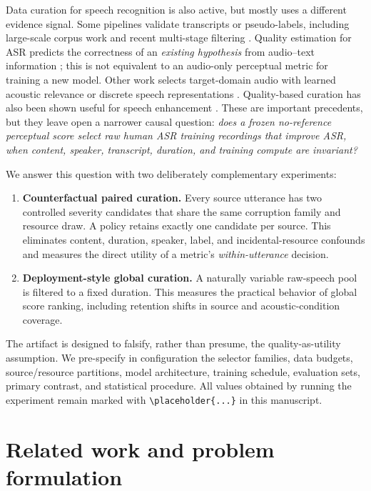 \documentclass[10pt,twocolumn]{article}
\newcommand{\placeholder}[1]{\textcolor{red}{\fbox{\scriptsize\textsf{#1}}}}
\newcommand{\asr}{\textsc{ASR}}
\begin{document}
Data curation for speech recognition is also active, but mostly uses a different evidence signal. Some pipelines validate transcripts or pseudo-labels, including large-scale corpus work and recent multi-stage filtering \citep{rangappa2025multistage}. Quality estimation for \asr{} predicts the correctness of an \emph{existing hypothesis} from audio--text information \citep{negri2014quality}; this is not equivalent to an audio-only perceptual metric for training a new model. Other work selects target-domain audio with learned acoustic relevance \citep{park2022contrastive} or discrete speech representations \citep{lu2022discrete}. Quality-based curation has also been shown useful for speech enhancement \citep{li2025lessismore}. These are important precedents, but they leave open a narrower causal question: \emph{does a frozen no-reference perceptual score select raw human \asr{} training recordings that improve \asr{}, when content, speaker, transcript, duration, and training compute are invariant?}

We answer this question with two deliberately complementary experiments:

\begin{enumerate}[leftmargin=1.2em,itemsep=0.15em]
    \item \textbf{Counterfactual paired curation.} Every source utterance has two controlled severity candidates that share the same corruption family and resource draw. A policy retains exactly one candidate per source. This eliminates content, duration, speaker, label, and incidental-resource confounds and measures the direct utility of a metric's \emph{within-utterance} decision.
    \item \textbf{Deployment-style global curation.} A naturally variable raw-speech pool is filtered to a fixed duration. This measures the practical behavior of global score ranking, including retention shifts in source and acoustic-condition coverage.
\end{enumerate}

The artifact is designed to falsify, rather than presume, the quality-as-utility assumption. We pre-specify in configuration the selector families, data budgets, source/resource partitions, model architecture, training schedule, evaluation sets, primary contrast, and statistical procedure. All values obtained by running the experiment remain marked with \verb|\placeholder{...}| in this manuscript.

\section{Related work and problem formulation}
\end{document}
